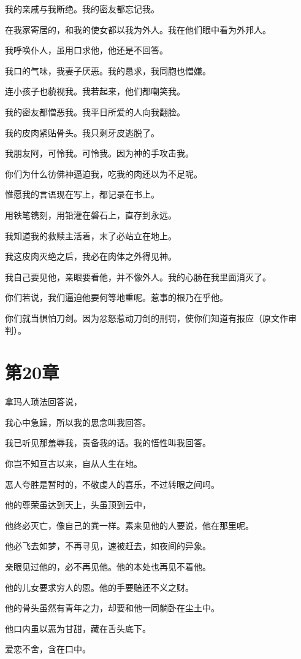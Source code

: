 \documentclass[12pt,oneside]{book}
\begin{document}
我的亲戚与我断绝。我的密友都忘记我。

在我家寄居的，和我的使女都以我为外人。我在他们眼中看为外邦人。

我呼唤仆人，虽用口求他，他还是不回答。

我口的气味，我妻子厌恶。我的恳求，我同胞也憎嫌。

连小孩子也藐视我。我若起来，他们都嘲笑我。

我的密友都憎恶我。我平日所爱的人向我翻脸。

我的皮肉紧贴骨头。我只剩牙皮逃脱了。

我朋友阿，可怜我。可怜我。因为神的手攻击我。

你们为什么彷佛神逼迫我，吃我的肉还以为不足呢。

惟愿我的言语现在写上，都记录在书上。

用铁笔镌刻，用铅灌在磐石上，直存到永远。

我知道我的救赎主活着，末了必站立在地上。

我这皮肉灭绝之后，我必在肉体之外得见神。

我自己要见他，亲眼要看他，并不像外人。我的心肠在我里面消灭了。

你们若说，我们逼迫他要何等地重呢。惹事的根乃在乎他。

你们就当惧怕刀剑。因为忿怒惹动刀剑的刑罚，使你们知道有报应（原文作审判）。


\chapter{第20章}
拿玛人琐法回答说，

我心中急躁，所以我的思念叫我回答。

我已听见那羞辱我，责备我的话。我的悟性叫我回答。

你岂不知亘古以来，自从人生在地。

恶人夸胜是暂时的，不敬虔人的喜乐，不过转眼之间吗。

他的尊荣虽达到天上，头虽顶到云中，

他终必灭亡，像自己的粪一样。素来见他的人要说，他在那里呢。

他必飞去如梦，不再寻见，速被赶去，如夜间的异象。

亲眼见过他的，必不再见他。他的本处也再见不着他。

他的儿女要求穷人的恩。他的手要赔还不义之财。

他的骨头虽然有青年之力，却要和他一同躺卧在尘土中。

他口内虽以恶为甘甜，藏在舌头底下。

爱恋不舍，含在口中。
\end{document}
